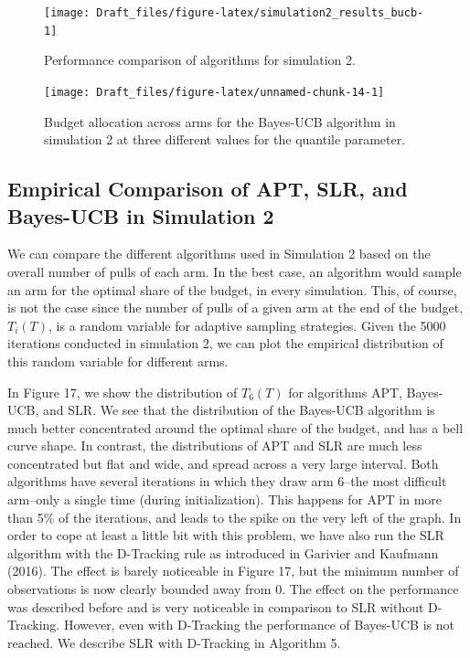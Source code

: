 \documentclass[11pt,]{article}
\begin{document}
\begin{figure}

{\centering \texttt{[image: Draft\_files/figure-latex/simulation2\_results\_bucb-1]} 

}

\caption{Performance comparison of algorithms for simulation 2.}\label{fig:simulation2_results_bucb}
\end{figure}

\begin{figure}

{\centering \texttt{[image: Draft\_files/figure-latex/unnamed-chunk-14-1]} 

}

\caption{Budget allocation across arms for the Bayes-UCB algorithm in simulation 2 at three different values for the quantile parameter.}\label{fig:unnamed-chunk-14}
\end{figure}

\subsection{Empirical Comparison of APT, SLR, and Bayes-UCB in
Simulation
2}\label{empirical-comparison-of-apt-slr-and-bayes-ucb-in-simulation-2}

We can compare the different algorithms used in Simulation 2 based on
the overall number of pulls of each arm. In the best case, an algorithm
would sample an arm for the optimal share of the budget, in every
simulation. This, of course, is not the case since the number of pulls
of a given arm at the end of the budget, \(T_i(T)\), is a random
variable for adaptive sampling strategies. Given the 5000 iterations
conducted in simulation 2, we can plot the empirical distribution of
this random variable for different arms.

In Figure 17, we show the distribution of \(T_6(T)\) for algorithms APT,
Bayes-UCB, and SLR. We see that the distribution of the Bayes-UCB
algorithm is much better concentrated around the optimal share of the
budget, and has a bell curve shape. In contrast, the distributions of
APT and SLR are much less concentrated but flat and wide, and spread
across a very large interval. Both algorithms have several iterations in
which they draw arm 6--the most difficult arm--only a single time
(during initialization). This happens for APT in more than 5\% of the
iterations, and leads to the spike on the very left of the graph. In
order to cope at least a little bit with this problem, we have also run
the SLR algorithm with the D-Tracking rule as introduced in Garivier and
Kaufmann (2016). The effect is barely noticeable in Figure 17, but the
minimum number of observations is now clearly bounded away from 0. The
effect on the performance was described before and is very noticeable in
comparison to SLR without D-Tracking. However, even with D-Tracking the
performance of Bayes-UCB is not reached. We describe SLR with D-Tracking
in Algorithm 5.
\end{document}
